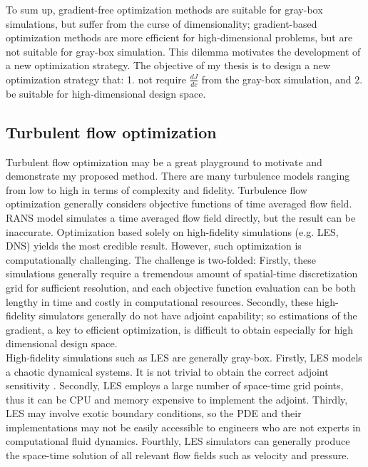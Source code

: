 \documentclass[a4paper,onecolumn]{article}
\theoremstyle{remark}
\begin{document}
\noindent To sum up, gradient-free optimization methods are suitable for gray-box simulations, but suffer from the curse of
dimensionality; gradient-based optimization methods are more efficient for high-dimensional problems, but are not suitable for 
gray-box simulation. This dilemma motivates the development of a new optimization strategy. 
The objective of my thesis is to design a new optimization strategy that: 1. not require $\frac{dJ}{dc}$ from the gray-box simulation, and 2. be suitable for high-dimensional 
design space.\\

\subsection{Turbulent flow optimization}
\noindent Turbulent flow optimization may be a great playground to motivate and demonstrate
my proposed method.
There are many turbulence models ranging from low to high in terms of complexity and fidelity. 
Turbulence flow optimization generally considers objective functions of time averaged flow field. RANS model simulates a time averaged flow field directly, but the result can be inaccurate. Optimization based solely on high-fidelity simulations (e.g. LES, DNS) yields the most credible result. However, such optimization is computationally challenging. The challenge is two-folded: Firstly, these simulations generally require a tremendous amount of spatial-time discretization grid for sufficient resolution, and each objective function evaluation can be both lengthy in time and costly in computational resources. Secondly, these high-fidelity simulators generally do not have adjoint capability; so estimations of the gradient, a key to efficient optimization, is difficult to obtain especially for high dimensional design space.\\

\noindent High-fidelity simulations such as LES are generally gray-box. 
Firstly, LES models a chaotic dynamical systems. 
It is not trivial to obtain the correct adjoint sensitivity \cite{chaotic Qiqi}.
Secondly, LES employs a large number of space-time grid points, thus it can be CPU and memory
expensive to implement the adjoint.
Thirdly, LES may involve exotic boundary conditions, so the PDE and their implementations
may not be easily accessible
to engineers who are not experts in computational fluid dynamics.
Fourthly, LES simulators can generally produce the space-time solution of all relevant flow fields
such as velocity and pressure.\\
\end{document}
